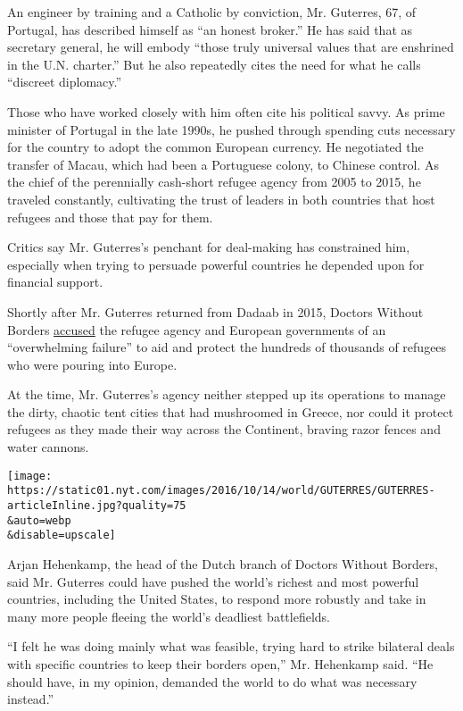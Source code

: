An engineer by training and a Catholic by conviction, Mr. Guterres, 67,
of Portugal, has described himself as ``an honest broker.'' He has said
that as secretary general, he will embody ``those truly universal values
that are enshrined in the U.N. charter.'' But he also repeatedly cites
the need for what he calls ``discreet diplomacy.''

Those who have worked closely with him often cite his political savvy.
As prime minister of Portugal in the late 1990s, he pushed through
spending cuts necessary for the country to adopt the common European
currency. He negotiated the transfer of Macau, which had been a
Portuguese colony, to Chinese control. As the chief of the perennially
cash-short refugee agency from 2005 to 2015, he traveled constantly,
cultivating the trust of leaders in both countries that host refugees
and those that pay for them.

Critics say Mr. Guterres's penchant for deal-making has constrained him,
especially when trying to persuade powerful countries he depended upon
for financial support.

Shortly after Mr. Guterres returned from Dadaab in 2015, Doctors Without
Borders
\href{https://www.doctorswithoutborders.org/sites/usa/files/msf_obstacle_course_to_europe_report2.pdf}{accused}
the refugee agency and European governments of an ``overwhelming
failure'' to aid and protect the hundreds of thousands of refugees who
were pouring into Europe.

At the time, Mr. Guterres's agency neither stepped up its operations to
manage the dirty, chaotic tent cities that had mushroomed in Greece, nor
could it protect refugees as they made their way across the Continent,
braving razor fences and water cannons.

\texttt{[image: https://static01.nyt.com/images/2016/10/14/world/GUTERRES/GUTERRES-articleInline.jpg?quality=75\\\&auto=webp\\\&disable=upscale]}

Arjan Hehenkamp, the head of the Dutch branch of Doctors Without
Borders, said Mr. Guterres could have pushed the world's richest and
most powerful countries, including the United States, to respond more
robustly and take in many more people fleeing the world's deadliest
battlefields.

``I felt he was doing mainly what was feasible, trying hard to strike
bilateral deals with specific countries to keep their borders open,''
Mr. Hehenkamp said. ``He should have, in my opinion, demanded the world
to do what was necessary instead.''

